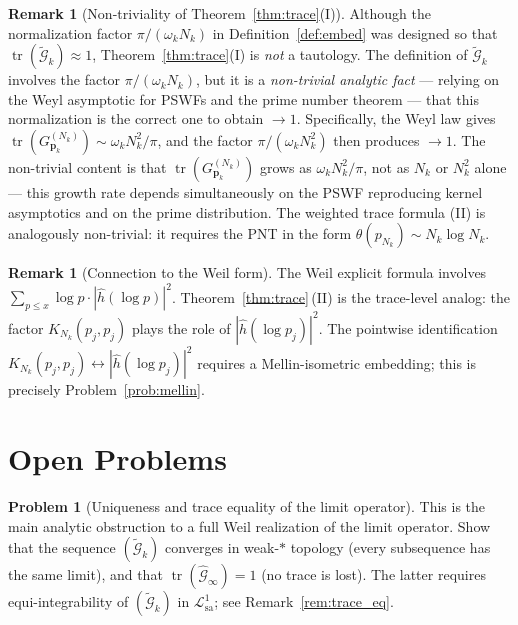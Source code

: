 \documentclass[12pt,a4paper]{amsart}
\theoremstyle{definition}
\newtheorem{remark}[theorem]{Remark}
\newtheorem{problem}{Problem}[section]
\newcommand{\GVMk}{G^{(N_k)}_{\mathbf{p}_k}}
\newcommand{\Lcal}{\mathcal{L}^1_{\mathrm{sa}}}
\newcommand{\Gcal}{\widehat{\mathcal{G}}}
\begin{document}
\begin{remark}[Non-triviality of Theorem~\ref{thm:trace}(I)]
\label{rem:trace_nontrivial}
Although the normalization factor $\pi/(\omega_k N_k)$ in
Definition~\ref{def:embed} was designed so that
$\operatorname{tr}(\widetilde{\mathcal{G}}_k)\approx1$,
Theorem~\ref{thm:trace}(I) is \emph{not} a tautology.
The definition of $\widetilde{\mathcal{G}}_k$ involves the
factor $\pi/(\omega_k N_k)$, but it is a \emph{non-trivial
analytic fact} --- relying on the Weyl asymptotic for PSWFs and
the prime number theorem --- that this normalization is the
correct one to obtain $\to1$.
Specifically, the Weyl law gives
$\operatorname{tr}(\GVMk)\sim\omega_k N_k^2/\pi$, and the
factor $\pi/(\omega_k N_k^2)$ then produces $\to1$.
The non-trivial content is that $\operatorname{tr}(\GVMk)$
grows as $\omega_k N_k^2/\pi$, not as $N_k$ or $N_k^2$ alone ---
this growth rate depends simultaneously on the PSWF reproducing
kernel asymptotics and on the prime distribution.
The weighted trace formula (II) is analogously non-trivial:
it requires the PNT in the form $\theta(p_{N_k})\sim N_k\log N_k$.
\end{remark}

\begin{remark}[Connection to the Weil form]\label{rem:weil_compare}
The Weil explicit formula involves
$\sum_{p\leq x}\log p\cdot|\widehat{h}(\log p)|^2$.
Theorem~\ref{thm:trace}\,(II) is the trace-level analog:
the factor $K_{N_k}(p_j,p_j)$ plays the role of
$|\widehat{h}(\log p_j)|^2$.
The pointwise identification $K_{N_k}(p_j,p_j)\leftrightarrow
|\widehat{h}(\log p_j)|^2$ requires a Mellin-isometric
embedding; this is precisely Problem~\ref{prob:mellin}.
\end{remark}

\section{Open Problems}\label{sec:open}

\begin{problem}[Uniqueness and trace equality of the limit
               operator]\label{prob:unique}
This is the main analytic obstruction to a full Weil realization
of the limit operator.
Show that the sequence $(\widetilde{\mathcal{G}}_k)$ converges
in weak-$*$ topology (every subsequence has the same limit), and
that $\operatorname{tr}(\Gcal_\infty)=1$ (no trace is lost).
The latter requires equi-integrability of $(\widetilde{\mathcal{G}}_k)$
in $\Lcal$; see Remark~\ref{rem:trace_eq}.
\end{problem}
\end{document}
